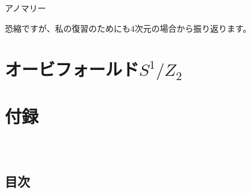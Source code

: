 \documentclass[
  unicode,a4paper,10pt,
  xcolor = {dvipsnames,svgnames},
  hyperref ={colorlinks=true,citecolor=Navy,linkcolor=NavyBlue,urlcolor=purple},
  ja=standard,lualatex
]{beamer}
\begin{document}
\begin{frame}{アノマリー}

  恐縮ですが、私の復習のためにも4次元の場合から振り返ります。

  

\end{frame}



\begin{frame}


  

\end{frame}



\section{オービフォールド\texorpdfstring{$S^{1}/Z_{2}$}{S1/Z2}}

\begin{frame}
  \huge \secname
\end{frame}


\begin{frame}

  

\end{frame}




\setcounter{Appendix}{\value{framenumber}}
\setcounter{section}{0}
\renewcommand{\thesubsection}{\Alph{subsection}}
\makeatletter
\renewcommand{\theequation}{\thesubsection.\arabic{equation}}

\renewcommand{\thefigure}{\thesubsection.\arabic{figure}}

\renewcommand{\thetable}{\thesubsection.\arabic{table}}
\makeatother

\section{付録}

\begin{frame}[plain]
  \frametitle{\ }
  \huge \secname
\end{frame}

\subsection{目次}
\end{document}
